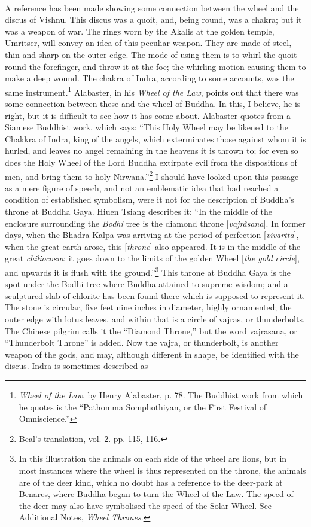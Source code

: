 \documentclass[a4paper, 11pt, oneside, polutonikogreek, english]{article}
\begin{document}
\paragraph{}
A reference has been made showing some connection between the wheel and the discus of Vishnu. This discus was a quoit, and, being round, was a chakra; but it was a weapon of war. The rings worn by the Akalis at the golden temple, Umritser, will convey an idea of this peculiar weapon. They are made of steel, thin and sharp on the outer edge. The mode of using them is to whirl the quoit round the forefinger, and throw it at the foe; the whirling motion causing them to make a deep wound. The chakra of Indra, according to some accounts, was the same instrument.\footnote{\emph{Wheel of the Law}, by Henry Alabaster, p. 78. The Buddhist work from which he quotes is the ``Pathomma Somphothiyan, or the First Festival of Omniscience.''} Alabaster, in his \emph{Wheel of the Law}, points out that there was some connection between these and the wheel of Buddha. In this, I believe, he is right, but it is difficult to see how it has come about. Alabaster quotes from a Siamese Buddhist work, which says: ``This Holy Wheel may be likened to the Chakkra of Indra, king of the angels, which exterminates those against whom it is hurled, and leaves no angel remaining in the heavens it is thrown to; for even so does the Holy Wheel of the Lord Buddha extirpate evil from the dispositions of men, and bring them to holy Nirwana.''\footnote{Beal's translation, vol. 2. pp. 115, 116.} I should have looked upon this passage as a mere figure of speech, and not an emblematic idea that had reached a condition of established symbolism, were it not for the description of Buddha's throne at Buddha Gaya. Hiuen Tsiang describes it: ``In the middle of the enclosure surrounding the \emph{Bodhi} tree is the diamond throne [\emph{vajrâsana}]. In former days, when the Bhadra-Kalpa was arriving at the period of perfection [\emph{vivartta}], when the great earth arose, this [\emph{throne}] also appeared. It is in the middle of the great \emph{chiliocosm}; it goes down to the limits of the golden Wheel [\emph{the gold circle}], and upwards it is flush with the ground.''\footnote{In this illustration the animals on each side of the wheel are lions, but in most instances where the wheel is thus represented on the throne, the animals are of the deer kind, which no doubt has a reference to the deer-park at Benares, where Buddha began to turn the Wheel of the Law. The speed of the deer may also have symbolised the speed of the Solar Wheel. See Additional Notes, \emph{Wheel Thrones}.} This throne at Buddha Gaya is the spot under the Bodhi tree where Buddha attained to supreme wisdom; and a sculptured slab of chlorite has been found there which is supposed to represent it. The stone is circular, five feet nine inches in diameter, highly ornamented; the outer edge with lotus leaves, and within that is a circle of vajras, or thunderbolts. The Chinese pilgrim calls it the ``Diamond Throne,'' but the word vajrasana, or ``Thunderbolt Throne'' is added. Now the vajra, or thunderbolt, is another weapon of the gods, and may, although different in shape, be identified with the discus. Indra is sometimes described as 
\end{document}

